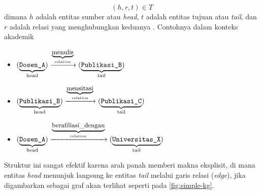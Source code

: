 \begin{equation}
    (h, r, t) \in T
    \label{eq:triplet-format}
\end{equation}
dimana $h$ adalah entitas sumber atau \textit{head}, $t$ adalah entitas tujuan atau \textit{tail}, dan $r$ adalah relasi yang menghubungkan keduanya \citep{peng2023knowledge}. Contohnya dalam konteks akademik
\begin{itemize}
    \item $(\underbrace{\text{\texttt{Dosen\_A}}}_{\text{head}}) \xrightarrow{\underbrace{\text{\small menulis}}_{\text{relation}}} (\underbrace{\text{\texttt{Publikasi\_B}}}_{\text{tail}})$
    \item $(\underbrace{\text{\texttt{Publikasi\_B}}}_{\text{head}}) \xrightarrow{\underbrace{\text{\small mensitasi}}_{\text{relation}}} (\underbrace{\text{\texttt{Publikasi\_C}}}_{\text{tail}})$
    \item $(\underbrace{\text{\texttt{Dosen\_A}}}_{\text{head}}) \xrightarrow{\underbrace{\text{\small berafiliasi\_dengan}}_{\text{relation}}} (\underbrace{\text{\texttt{Universitas\_X}}}_{\text{tail}})$
\end{itemize}
Struktur ini sangat efektif karena arah panah memberi makna eksplisit, di mana entitas \textit{head} menunjuk langsung ke entitas \textit{tail} melalui garis relasi (\textit{edge}), jika digambarkan sebagai graf akan terlihat seperti pada \ref{fig:simple-kg}.

